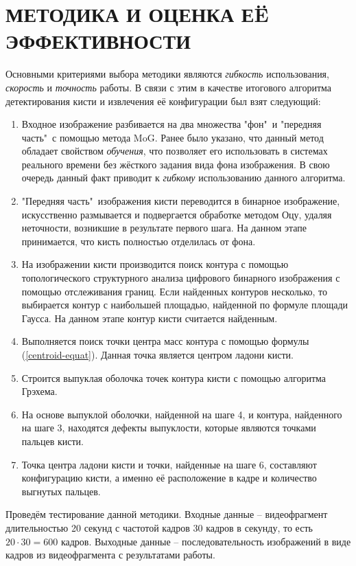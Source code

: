 \section{\centering МЕТОДИКА И ОЦЕНКА ЕË ЭФФЕКТИВНОСТИ}

Основными критериями выбора методики являются {\it гибкость} использования,
{\it скорость} и {\it точность} работы. В связи с этим в качестве итогового алгоритма 
детектирования кисти и извлечения её конфигурации был взят следующий:
\begin{enumerate}
	\item Входное изображение разбивается на два множества "фон"\ и "передняя часть"\ с помощью
метода MoG. Ранее было указано, что данный метод обладает свойством {\it обучения}, что позволяет
его использовать в системах реального времени без жёсткого задания вида фона изображения.
В свою очередь данный факт приводит к {\it гибкому} использованию данного алгоритма.
	\item "Передняя часть"\ изображения кисти переводится в бинарное изображение,
искусственно размывается и подвергается обработке методом Оцу, удаляя неточности, 
возникшие в результате первого шага. На данном этапе принимается, что кисть 
полностью отделилась от фона.
	\item На изображении кисти производится поиск контура с помощью топологического
структурного анализа цифрового бинарного изображения с помощью отслеживания границ. 
Если найденных контуров несколько, то выбирается контур с наибольшей площадью, найденной
по формуле площади Гаусса. На данном этапе контур кисти считается найденным.
	\item Выполняется поиск точки центра масс контура с помощью формулы (\ref{centroid-equat}).
Данная точка является центром ладони кисти.
	\item Строится выпуклая оболочка точек контура кисти с помощью алгоритма Грэхема. 
	\item На основе выпуклой оболочки, найденной на шаге 4, и контура, найденного на шаге 3,
находятся дефекты выпуклости, которые являются точками пальцев кисти. 
	\item Точка центра ладони кисти и точки, найденные на шаге 6, составляют конфигурацию кисти,
а именно её расположение в кадре и количество выгнутых пальцев.
\end{enumerate}

Проведём тестирование данной методики. Входные данные -- видеофрагмент длительностью
20 секунд с частотой кадров 30 кадров в секунду, то есть $20\cdot30 = 600$ кадров.
Выходные данные -- последовательность изображений в виде кадров из видеофрагмента
с результатами работы.

